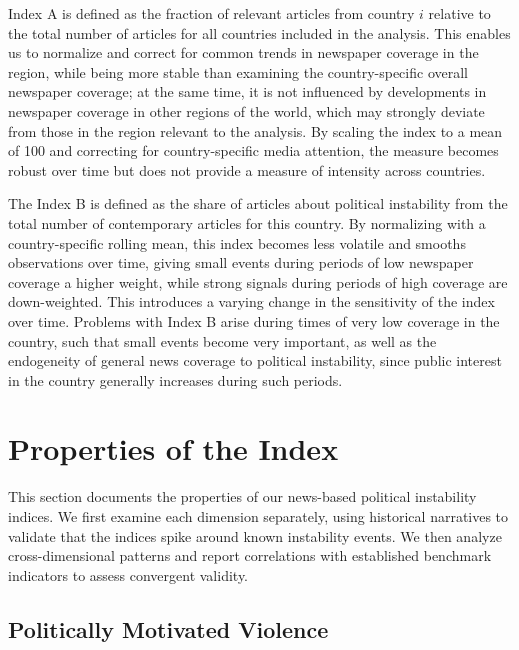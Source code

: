 \documentclass[12pt,a4paper,fleqn]{article}
\begin{document}
Index A is defined as the fraction of relevant articles from country $i$ relative to the total number of articles for all countries included in the analysis. This enables us to normalize and correct for common trends in newspaper coverage in the region, while being more stable than examining the country-specific overall newspaper coverage; at the same time, it is not influenced by developments in newspaper coverage in other regions of the world, which may strongly deviate from those in the region relevant to the analysis. By scaling the index to a mean of 100 and correcting for country-specific media attention, the measure becomes robust over time but does not provide a measure of intensity across countries. 

The Index B is defined as the share of articles about political instability from the total number of contemporary articles for this country. By normalizing with a country-specific rolling mean, this index becomes less volatile and smooths observations over time, giving small events during periods of low newspaper coverage a higher weight, while strong signals during periods of high coverage are down-weighted. This introduces a varying change in the sensitivity of the index over time. Problems with Index B arise during times of very low coverage in the country, such that small events become very important, as well as the endogeneity of general news coverage to political instability, since public interest in the country generally increases during such periods. 



\section{Properties of the Index}\label{sec:properties}

This section documents the properties of our news-based political instability indices. We first examine each dimension separately, using historical narratives to validate that the indices spike around known instability events. We then analyze cross-dimensional patterns and report correlations with established benchmark indicators to assess convergent validity.


\subsection{Politically Motivated Violence}\label{sec:political_violence}
\end{document}
